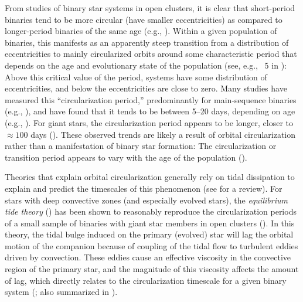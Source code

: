 \documentclass[modern, letterpaper]{aastex62}
\begin{document}
From studies of binary star systems in open clusters, it is clear that
short-period binaries tend to be more circular (have smaller eccentricities) as
compared to longer-period binaries of the same age (e.g.,
\citealt{Mathieu:2005}).
Within a given population of binaries, this manifests as an apparently steep
transition from a distribution of eccentricities to mainly circularized orbits
around some characteristic period that depends on the age and evolutionary state
of the population (see, e.g., \figurename~5 in \citealt{Mathieu:2005}):
Above this critical value of the period, systems have some distribution of
eccentricities, and below the eccentricities are close to zero.  Many studies
have measured this ``circularization period,'' predominantly for main-sequence
binaries (e.g., \citealt{Meibom:2006, Kjurkchieva:2017}), and have found that it
tends to be between 5--20 days, depending on age (e.g., \citealt{Mathieu:1988}).
For giant stars, the circularization period appears to be longer, closer to
$\approx 100$ days (\citealt{Mayor:1984}).
These observed trends are likely a result of orbital circularization rather than
a manifestation of binary star formation: The circularization or transition
period appears to vary with the age of the population (\citealt{Meibom:2005}).

Theories that explain orbital circularization generally rely on tidal
dissipation to explain and predict the timescales of this phenomenon (see
\citealt{Mazeh:2007hp} for a review).
For stars with deep convective zones (and especially evolved stars), the
\emph{equilibrium tide theory} (\citealt{Zahn:1977, Zahn:1989}) has been shown
to reasonably reproduce the circularization periods of a small sample of
binaries with giant star members in open clusters (\citealt{Verbunt:1995}).
In this theory, the tidal bulge induced on the primary (evolved) star will lag
the orbital motion of the companion because of coupling of the tidal flow to
turbulent eddies driven by convection.
These eddies cause an effective viscosity in the convective region of the
primary star, and the magnitude of this viscosity affects the amount of lag,
which directly relates to the circularization timescale for a given binary
system (\citealt{Zahn:1989}; also summarized in \citealt{Goodman:1997}).
\end{document}
